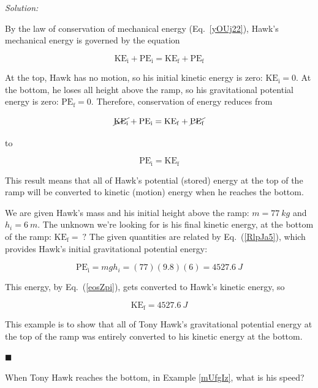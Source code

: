 \documentclass[dvipsnames]{article}
\begin{document}
\textit{Solution:} 

By the law of conservation of mechanical energy (Eq.~\ref{yOUj22}), Hawk's mechanical energy is governed by the equation

\begin{equation*} 
    \mathrm{KE_i} + \mathrm{PE_i} = \mathrm{KE_f} + \mathrm{PE_f}
\end{equation*}

At the top, Hawk has no motion, so his initial kinetic energy is zero: $\mathrm{KE_i} = 0$. At the bottom, he loses all height above the ramp, so his gravitational potential energy is zero: $\mathrm{PE_f} = 0$. Therefore, conservation of energy reduces from

\begin{equation*}
    \cancel{\mathrm{KE_i}} + \mathrm{PE_i} = \mathrm{KE_f} + \cancel{\mathrm{PE_f}}
\end{equation*}

to

\begin{equation} \label{eosZpi}
    \mathrm{PE_i} = \mathrm{KE_f}
\end{equation}

This result means that all of Hawk's potential (stored) energy at the top of the ramp will be converted to kinetic (motion) energy when he reaches the bottom.

We are given Hawk's mass and his initial height above the ramp: $m = \SI{77}{kg}$ and $h_i = \SI{6}{m}$. The unknown we're looking for is his final kinetic energy, at the bottom of the ramp: $\mathrm{KE_f} =\ ?$ The given quantities are related by Eq.~(\ref{RlpJa5}), which provides Hawk's initial gravitational potential energy:

\begin{equation*}
    \mathrm{PE_i} = mgh_i = (77)(9.8)(6) = \SI{4527.6}{J} 
\end{equation*}

This energy, by Eq.~(\ref{eosZpi}), gets converted to Hawk's kinetic energy, so

\begin{equation*}
    \mathrm{KE_f} = \SI{4527.6}{J} 
\end{equation*}

This example is to show that all of Tony Hawk's gravitational potential energy at the top of the ramp was entirely converted to his kinetic energy at the bottom.

\hfill $\blacksquare$


\begin{example} \label{nQVUKM}
When Tony Hawk reaches the bottom, in Example \ref{mUfgIz}, what is his speed?
\end{example} 
\end{document}
